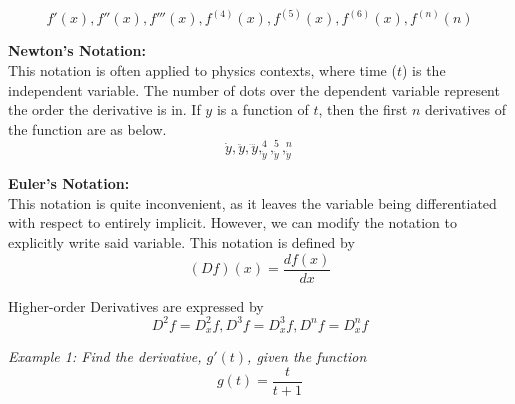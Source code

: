 \documentclass{article}
\begin{document}
            \begin{equation*}
                f'(x), f''(x), f'''(x), f^{(4)}(x),f^{(5)}(x),f^{(6)}(x),f^{(n)}(n)
            \end{equation*}

            \noindent \color{purple} \textbf{Newton's Notation:} \color{black} \\

            This notation is often applied to physics contexts, where time ($t$) is the independent
            variable. The number of dots over the dependent variable represent the order the
            derivative is in. If $y$ is a function of $t$, then the first $n$ derivatives of
            the function are as below. \\

            \begin{equation*}
                \dot{y}, \ddot{y}, \dddot{y}, _{\dot{y}}^4, _{\dot{y}}^5, _{\dot{y}}^n
            \end{equation*}

            \noindent \color{purple} \textbf{Euler's Notation:} \color{black} \\
            This notation is quite inconvenient, as it leaves the variable being differentiated with
            respect to entirely implicit. However, we can modify the notation to explicitly write
            said variable. This notation is defined by \\

            \begin{equation*}
                (Df)(x) = \frac{df(x)}{dx}
            \end{equation*}

            \pagebreak
            \noindent Higher-order Derivatives are expressed by \\

            \begin{equation*}
                D^2f=D^2_xf, D^3f=D^3_xf, D^nf=D^n_xf
            \end{equation*}

            \noindent \color{blue} \textit{Example 1: Find the derivative, $g'(t)$, given the function} \\

            \begin{equation}
                g(t) = \frac{t}{t+1}
            \end{equation} \color{black}
\end{document}
